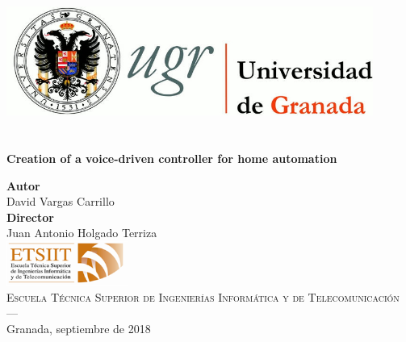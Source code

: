 \begin{titlepage}
 
 
\newlength{\centeroffset}
\setlength{\centeroffset}{-0.5\oddsidemargin}
\addtolength{\centeroffset}{0.5\evensidemargin}
\thispagestyle{empty}

\noindent\hspace*{\centeroffset}\begin{minipage}{\textwidth}

\centering
\includegraphics[width=0.9\textwidth]{images/logo_ugr.jpg}\\[1.4cm]

\textsc{ \Large \mySubject\\[0.2cm]}
\textsc{ \myDegree}\\[1cm]
% 
\vspace{0.3cm}
{\huge\bfseries Creation of a voice-driven controller for home automation\\
}
\vspace{0.7cm}
\end{minipage}

\vspace{2.5cm}
\noindent\hspace*{\centeroffset}\begin{minipage}{\textwidth}
\centering

\textbf{Autor}\\ {David Vargas Carrillo}\\[2.5ex]
\textbf{Director}\\
{Juan Antonio Holgado Terriza}\\[2cm]
\includegraphics[width=0.3\textwidth]{images/etsiit_logo.png}\\[0.1cm]
\textsc{Escuela Técnica Superior de Ingenierías Informática y de Telecomunicación}\\
\textsc{---}\\
Granada, septiembre de 2018
\end{minipage}
\end{titlepage}


